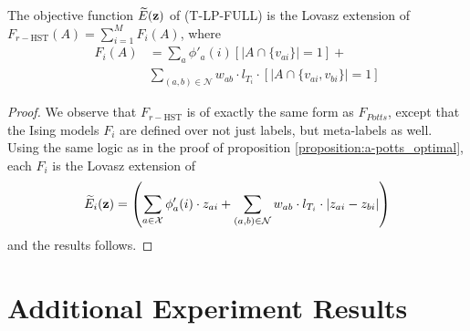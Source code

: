 {{{{{{\proposition The objective function $\widetilde{E}({\bf z})$ of (T-LP-FULL) is the Lovasz extension of $F_{r-\textrm{HST}}(A) = \sum_{i = 1}^M F_i(A)$, where
\begin{align}
    F_i(A) &= \sum_a \phi'_{a}(i) [|A \cap \{v_{ai}\}| = 1] + \nonumber \\
           &\sum_{(a, b) \in {\mathcal N}} {w_{ab}} \cdot l_{T_i} \cdot [|A \cap \{v_{ai}, v_{bi}\}| = 1]
\end{align}
\begin{proof}
    We observe that $F_{r-\textrm{HST}}$ is of exactly the same form as $F_{Potts}$, except that the Ising models $F_i$ are defined over not just labels, but meta-labels as well. Using the same logic as in the proof of proposition \ref{proposition:a-potts_optimal}, each $F_i$ is the Lovasz extension of 
        \begin{equation}
            \widetilde{E}_i({\bf z}) = \left( \sum_{a \in {\mathcal X}} \phi_a'(i) \cdot z_{ai} + \sum_{(a, b) \in {\mathcal N}} w_{ab} \cdot l_{T_i} \cdot |z_{ai} - z_{bi}| \right)
        \end{equation}
    and the results follows. 
\end{proof}

\section{Additional Experiment Results}

}}}}}}
